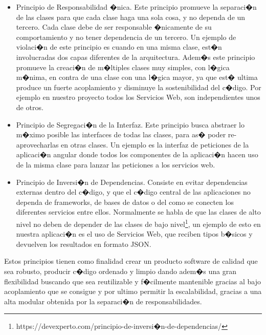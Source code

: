 \begin{itemize}

\item Principio de Responsabilidad �nica. Este principio promueve la separaci�n de las clases para que cada clase haga una sola cosa, y no dependa de un tercero. Cada clase debe de ser responsable �nicamente de su comportamiento y no tener dependencia de un tercero. Un ejemplo de violaci�n de este principio es cuando en una misma clase, est�n involucradas dos capas diferentes de la arquitectura. Adem�s este principio promueve la creaci�n de m�ltiples clases muy simples, con l�gica m�nima, en contra de una clase con una l�gica mayor, ya que est� ultima produce un fuerte acoplamiento y disminuye la sostenibilidad del c�digo. Por ejemplo en nuestro proyecto todos los Servicios Web, son independientes unos de  otros.

\item Principio de Segregaci�n de la Interfaz. Este principio busca abstraer lo m�ximo posible las interfaces de todas las clases, para as� poder re-aprovecharlas en otras clases. Un ejemplo es la interfaz de peticiones de la aplicaci�n angular donde todos los componentes de la aplicaci�n hacen uso de la misma clase para lanzar las peticiones a los servicios web.

\item Principio de Inversi�n de Dependencias. Consiste en evitar dependencias externas dentro del c�digo, y que el c�digo central de las aplicaciones no dependa de frameworks, de bases de datos o del como se conecten los diferentes servicios entre ellos. Normalmente se habla de que las clases de alto nivel no deben de depender de las clases de bajo nivel\footnote{https://devexperto.com/principio-de-inversi�n-de-dependencias/}, un ejemplo de esto en nuestra aplicaci�n es el uso de Servicios Web, que reciben tipos b�sicos y devuelven los resultados en formato JSON.

\end{itemize}

Estos principios tienen como finalidad crear un producto software de calidad que sea robusto, producir c�digo ordenado y limpio dando adem�s una gran flexibilidad buscando que sea reutilizable y f�cilmente mantenible gracias al bajo acoplamiento que se consigue y por ultimo permitir la escalabilidad, gracias a una alta modular obtenida por la separaci�n de responsabilidades.



